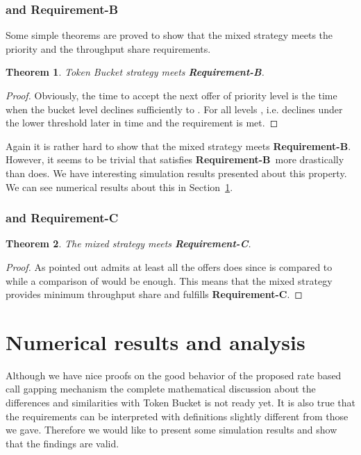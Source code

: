 \documentclass[conference]{IEEEtran}
\newtheorem{theorem}{Theorem}
\newcommand{\comment}[1]{}
\newcommand{\reqB}{\textbf{Requirement-B}}
\newcommand{\reqC}{\textbf{Requirement-C}}
\begin{document}
\comment{ AN IDEA: Show that .
Obviously for  so this algorithm has
better throughput than the normal rate based call gapping.

This is the reason why simulations shows that this algorithm has the
best throughput.}

\subsubsection{ and Requirement-B}
Some simple theorems are proved to show that the mixed strategy
meets the priority and the throughput share requirements.

\begin{theorem}
Token Bucket strategy  meets \reqB.
\end{theorem}

\begin{proof} Obviously, the time to accept the next offer of priority level
 is the time when the bucket level declines sufficiently to
. For all levels ,  i.e.  declines
under the lower threshold later in time and the requirement is
met.\end{proof}

Again it is rather hard to show that the mixed strategy 
meets \reqB. However, it seems to be trivial that 
satisfies \reqB\ more drastically than  does. We have
interesting simulation results presented about this property. We can
see numerical results about this in
Section~\ref{section:numerical-results}.

\subsubsection{ and Requirement-C}
\begin{theorem}
The mixed strategy  meets \reqC.
\end{theorem}

\begin{proof} As pointed out  admits at least all the offers
 does since  is compared to 
while a comparison of  would be enough. This means
that the mixed strategy provides minimum throughput share and
fulfills \reqC.
\end{proof}

\section{Numerical results and
analysis}\label{section:numerical-results}
Although we have nice proofs on the good behavior of the proposed
rate based call gapping mechanism the complete mathematical
discussion about the differences and similarities with Token Bucket
is not ready yet. It is also true that the requirements can be
interpreted with definitions slightly different from those we gave.
Therefore we would like to present some simulation results and show
that the findings are valid.
\end{document}
